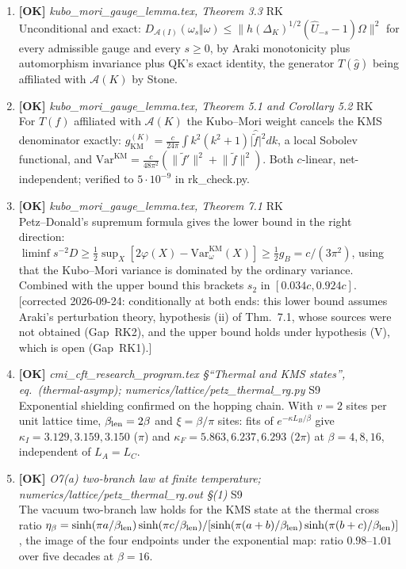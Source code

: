 \documentclass[11pt]{article}
\begin{document}
\begin{enumerate}[leftmargin=1.6em,itemsep=6pt]
\item \textbf{[OK]} \emph{kubo\_mori\_gauge\_lemma.tex, Theorem 3.3} \hfill\textsc{RK}\\ Unconditional and exact: $D_{\mathcal A(I)}(\omega_s\Vert\omega)\le\lVert h(\Delta_K)^{1/2}(\hat U_{-s}-1)\Omega\rVert^2$ for every admissible gauge and every $s\ge0$, by Araki monotonicity plus automorphism invariance plus QK's exact identity, the generator $T(\hat g)$ being affiliated with $\mathcal A(K)$ by Stone.
\item \textbf{[OK]} \emph{kubo\_mori\_gauge\_lemma.tex, Theorem 5.1 and Corollary 5.2} \hfill\textsc{RK}\\ For $T(f)$ affiliated with $\mathcal A(K)$ the Kubo--Mori weight cancels the KMS denominator exactly: $g_{\mathrm{KM}}^{(K)}=\frac{c}{24\pi}\int k^2(k^2+1)\lvert\hat{\tilde f}\rvert^2dk$, a local Sobolev functional, and $\mathrm{Var}^{\mathrm{KM}}=\frac{c}{48\pi^2}(\lVert\tilde f'\rVert^2+\lVert\tilde f\rVert^2)$. Both $c$-linear, net-independent; verified to $5\cdot10^{-9}$ in rk\_check.py.
\item \textbf{[OK]} \emph{kubo\_mori\_gauge\_lemma.tex, Theorem 7.1} \hfill\textsc{RK}\\ Petz--Donald's supremum formula gives the lower bound in the right direction: $\liminf s^{-2}D\ge\frac12\sup_X[2\varphi(X)-\mathrm{Var}^{\mathrm{KM}}_\omega(X)]\ge\frac12 g_B=c/(3\pi^2)$, using that the Kubo--Mori variance is dominated by the ordinary variance. Combined with the upper bound this brackets $s_2$ in $[0.034c,0.924c]$. [corrected 2026-09-24: conditionally at both ends: this lower bound assumes Araki's perturbation theory, hypothesis (ii) of Thm.~7.1, whose sources were not obtained (Gap~RK2), and the upper bound holds under hypothesis (V), which is open (Gap~RK1).]
\item \textbf{[OK]} \emph{cmi\_cft\_research\_program.tex \S``Thermal and KMS states'', eq.~(thermal-asymp); numerics/lattice/petz\_thermal\_rg.py} \hfill\textsc{S9}\\ Exponential shielding confirmed on the hopping chain. With \(v=2\) sites per unit lattice time, \(\beta_{\rm len}=2\beta\) and \(\xi=\beta/\pi\) sites: fits of \(e^{-\kappa L_B/\beta}\) give \(\kappa_I=3.129,3.159,3.150\) (\(\pi\)) and \(\kappa_F=5.863,6.237,6.293\) (\(2\pi\)) at \(\beta=4,8,16\), independent of \(L_A=L_C\).
\item \textbf{[OK]} \emph{O7(a) two-branch law at finite temperature; numerics/lattice/petz\_thermal\_rg.out \S(1)} \hfill\textsc{S9}\\ The vacuum two-branch law holds for the KMS state at the thermal cross ratio \(\eta_\beta=\sinh(\pi a/\beta_{\rm len})\sinh(\pi c/\beta_{\rm len})/[\sinh(\pi(a+b)/\beta_{\rm len})\sinh(\pi(b+c)/\beta_{\rm len})]\), the image of the four endpoints under the exponential map: ratio \(0.98\)--\(1.01\) over five decades at \(\beta=16\).

\end{enumerate}
\end{document}
